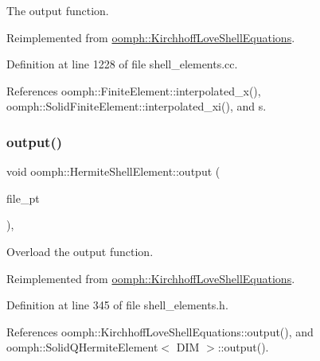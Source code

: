 The output function. 

Reimplemented from \hyperlink{classoomph_1_1KirchhoffLoveShellEquations_a5173eb461b8c893b0dc657aae90192c7}{oomph\+::\+Kirchhoff\+Love\+Shell\+Equations}.



Definition at line 1228 of file shell\+\_\+elements.\+cc.



References oomph\+::\+Finite\+Element\+::interpolated\+\_\+x(), oomph\+::\+Solid\+Finite\+Element\+::interpolated\+\_\+xi(), and s.

\mbox{\label{classoomph_1_1HermiteShellElement_a126ebcc503395e036c6bfaf8fabbc800}} 
\subsubsection{\texorpdfstring{output()}{output()}\hspace{0.1cm}{\footnotesize\ttfamily [3/4]}}
{\footnotesize\ttfamily void oomph\+::\+Hermite\+Shell\+Element\+::output (\begin{DoxyParamCaption}\item[{F\+I\+LE $\ast$}]{file\+\_\+pt }\end{DoxyParamCaption})\hspace{0.3cm}{\ttfamily [inline]}, {\ttfamily [virtual]}}



Overload the output function. 



Reimplemented from \hyperlink{classoomph_1_1KirchhoffLoveShellEquations_adf7b87a8ee3ae1a594cd88772b7ac694}{oomph\+::\+Kirchhoff\+Love\+Shell\+Equations}.



Definition at line 345 of file shell\+\_\+elements.\+h.



References oomph\+::\+Kirchhoff\+Love\+Shell\+Equations\+::output(), and oomph\+::\+Solid\+Q\+Hermite\+Element$<$ D\+I\+M $>$\+::output().

\mbox{\label{classoomph_1_1HermiteShellElement_a805a6e65b4dbb7bcffab6180ff9686ba}} 
